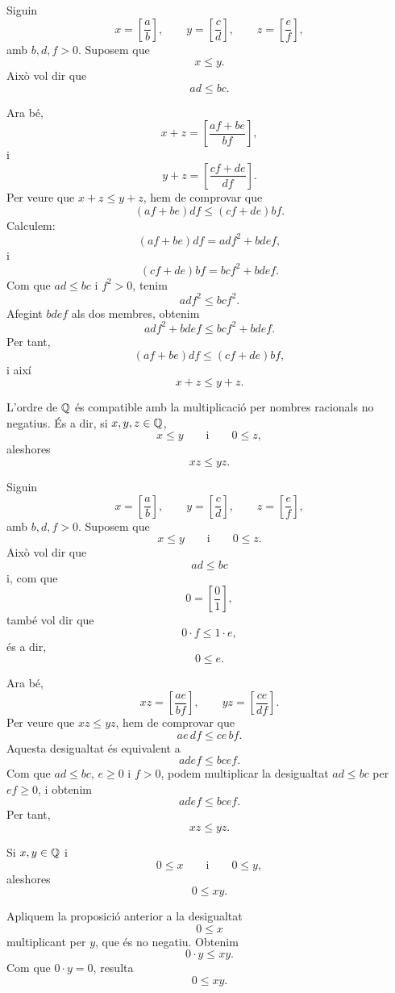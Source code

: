 \begin{prova}
Siguin
\[
	x=\left[\frac{a}{b}\right],
	\qquad
	y=\left[\frac{c}{d}\right],
	\qquad
	z=\left[\frac{e}{f}\right],
\]
amb \(b,d,f>0\). Suposem que
\[
	x\leq y.
\]
Això vol dir que
\[
	ad\leq bc.
\]

Ara bé,
\[
	x+z
	=
	\left[\frac{af+be}{bf}\right],
\]
i
\[
	y+z
	=
	\left[\frac{cf+de}{df}\right].
\]
Per veure que \(x+z\leq y+z\), hem de comprovar que
\[
	(af+be)df\leq (cf+de)bf.
\]
Calculem:
\[
	(af+be)df
	=
	adf^2+bdef,
\]
i
\[
	(cf+de)bf
	=
	bcf^2+bdef.
\]
Com que \(ad\leq bc\) i \(f^2>0\), tenim
\[
	adf^2\leq bcf^2.
\]
Afegint \(bdef\) als dos membres, obtenim
\[
	adf^2+bdef\leq bcf^2+bdef.
\]
Per tant,
\[
	(af+be)df\leq (cf+de)bf,
\]
i així
\[
	x+z\leq y+z.
\]
\end{prova}

\begin{proposicio}
L'ordre de \(\mathbb{Q}\) és compatible amb la multiplicació per nombres racionals no negatius. És a dir, si \(x,y,z\in\mathbb{Q}\),
\[
	x\leq y
	\qquad\text{i}\qquad
	0\leq z,
\]
aleshores
\[
	xz\leq yz.
\]
\end{proposicio}

\begin{prova}
Siguin
\[
	x=\left[\frac{a}{b}\right],
	\qquad
	y=\left[\frac{c}{d}\right],
	\qquad
	z=\left[\frac{e}{f}\right],
\]
amb \(b,d,f>0\). Suposem que
\[
	x\leq y
	\qquad\text{i}\qquad
	0\leq z.
\]
Això vol dir que
\[
	ad\leq bc
\]
i, com que
\[
	0=\left[\frac{0}{1}\right],
\]
també vol dir que
\[
	0\cdot f\leq 1\cdot e,
\]
és a dir,
\[
	0\leq e.
\]

Ara bé,
\[
	xz
	=
	\left[\frac{ae}{bf}\right],
	\qquad
	yz
	=
	\left[\frac{ce}{df}\right].
\]
Per veure que \(xz\leq yz\), hem de comprovar que
\[
	ae\,df\leq ce\,bf.
\]
Aquesta desigualtat és equivalent a
\[
	adef\leq bcef.
\]
Com que \(ad\leq bc\), \(e\geq0\) i \(f>0\), podem multiplicar la desigualtat \(ad\leq bc\) per \(ef\geq0\), i obtenim
\[
	adef\leq bcef.
\]
Per tant,
\[
	xz\leq yz.
\]
\end{prova}

\begin{corollari}
Si \(x,y\in\mathbb{Q}\) i
\[
	0\leq x
	\qquad\text{i}\qquad
	0\leq y,
\]
aleshores
\[
	0\leq xy.
\]
\end{corollari}

\begin{prova}
Apliquem la proposició anterior a la desigualtat
\[
	0\leq x
\]
multiplicant per \(y\), que és no negatiu. Obtenim
\[
	0\cdot y\leq xy.
\]
Com que \(0\cdot y=0\), resulta
\[
	0\leq xy.
\]
\end{prova}

